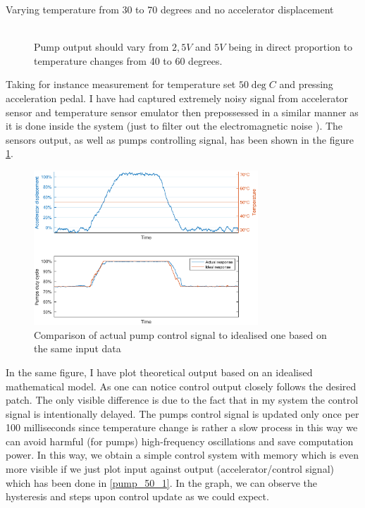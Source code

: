 \begin{description}
    \item[Varying temperature from 30 to 70 degrees and no accelerator displacement] \hfill \\ Pump output should vary from $2,5V$ and $5V$ being in direct proportion to temperature changes from 40 to 60 degrees.
\end{description}

Taking for instance measurement for temperature set $50\deg C$ and pressing acceleration pedal. I have had captured extremely noisy signal from accelerator sensor and temperature sensor emulator then prepossessed in a similar manner as it is done inside the system (just to filter out the electromagnetic noise ). The sensors output, as well as pumps controlling signal, has been shown in the figure \ref{pump_50}.

\begin{figure}[h]
    \centering
    \includegraphics[height=5.8cm]{figures/pump_50.eps}
    \caption[Temperature set to 50\textdegree C and varying accelerator displacement]{Comparison of actual pump control signal to idealised one based on the same input data}
    \label{pump_50}
\end{figure}

In the same figure, I have plot theoretical output based on an idealised mathematical model. As one can notice control output closely follows the desired patch. The only visible difference is due to the fact that in my system the control signal is intentionally delayed.
The pumps control signal is updated only once per 100 milliseconds since temperature change is rather a slow process in this way we can avoid harmful (for pumps) high-frequency oscillations and save computation power. In this way, we obtain a simple control system with memory which is even more visible if we just plot input against output (accelerator/control signal) which has been done in \ref{pump_50_1}. In the graph, we can observe the hysteresis and steps upon control update as we could expect.


